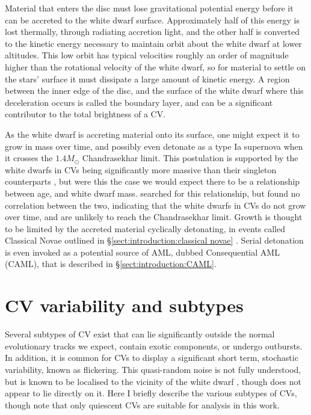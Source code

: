 Material that enters the disc must lose gravitational potential energy before it can be accreted to the white dwarf surface. Approximately half of this energy is lost thermally, through radiating accretion light, and the other half is converted to the kinetic energy necessary to maintain orbit about the white dwarf at lower altitudes. This low orbit has typical velocities roughly an order of magnitude higher than the rotational velocity of the white dwarf, so for material to settle on the stars' surface it must dissipate a large amount of kinetic energy. A region between the inner edge of the disc, and the surface of the white dwarf where this deceleration occurs is called the boundary layer, and can be a significant contributor to the total brightness of a CV. 

As the white dwarf is accreting material onto its surface, one might expect it to grow in mass over time, and possibly even detonate as a type Ia supernova when it crosses the $1.4 M_\odot$ Chandrasekhar limit. This postulation is supported by the white dwarfs in CVs being significantly more massive than their singleton counterparts \citep{zorotovic2011}, but were this the case we would expect there to be a relationship between age, and white dwarf mass. \citet{McAllister2019} searched for this relationship, but found no correlation between the two, indicating that the white dwarfs in CVs do not grow over time, and are unlikely to reach the Chandrasekhar limit. Growth is thought to be limited by the accreted material cyclically detonating, in events called Classical Novae outlined in \S\ref{sect:introduction:classical novae} \citep{Wijnen2015,sparks2021}. Serial detonation is even invoked as a potential source of AML, dubbed Consequential AML (CAML), that is described in \S\ref{sect:introduction:CAML}.


\newpage
\section{CV variability and subtypes}
\label{sect:introduction:CV subtypes}
Several subtypes of CV exist that can lie significantly outside the normal evolutionary tracks we expect, contain exotic components, or undergo outbursts. 
In addition, it is common for CVs to display a significant short term, stochastic variability, known as flickering. This quasi-random noise is not fully understood, but is known to be localised to the vicinity of the white dwarf \citep{horne1985,bruch1996,bruch2000}, though does not appear to lie directly on it.
Here I briefly describe the various subtypes of CVs, though note that only quiescent CVs are suitable for analysis in this work. 

